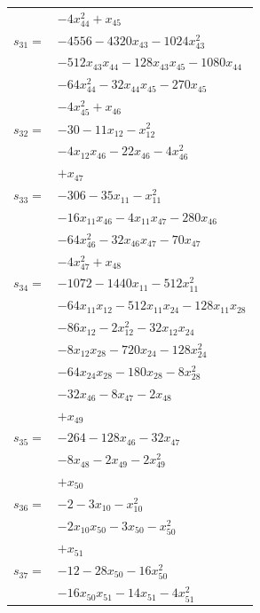 \begin{longtable}{@{}r@{\;}l@{}}
 & \(\displaystyle -4x_{44}^{2} +x_{45}\) \\[3pt]
\(s_{31}=\) & \(\displaystyle -4556 -4320x_{43} -1024x_{43}^{2}\) \\
 & \(\displaystyle -512x_{43}x_{44} -128x_{43}x_{45} -1080x_{44}\) \\
 & \(\displaystyle -64x_{44}^{2} -32x_{44}x_{45} -270x_{45}\) \\
 & \(\displaystyle -4x_{45}^{2} +x_{46}\) \\[3pt]
\(s_{32}=\) & \(\displaystyle -30 -11x_{12} -x_{12}^{2}\) \\
 & \(\displaystyle -4x_{12}x_{46} -22x_{46} -4x_{46}^{2}\) \\
 & \(\displaystyle +x_{47}\) \\[3pt]
\(s_{33}=\) & \(\displaystyle -306 -35x_{11} -x_{11}^{2}\) \\
 & \(\displaystyle -16x_{11}x_{46} -4x_{11}x_{47} -280x_{46}\) \\
 & \(\displaystyle -64x_{46}^{2} -32x_{46}x_{47} -70x_{47}\) \\
 & \(\displaystyle -4x_{47}^{2} +x_{48}\) \\[3pt]
\(s_{34}=\) & \(\displaystyle -1072 -1440x_{11} -512x_{11}^{2}\) \\
 & \(\displaystyle -64x_{11}x_{12} -512x_{11}x_{24} -128x_{11}x_{28}\) \\
 & \(\displaystyle -86x_{12} -2x_{12}^{2} -32x_{12}x_{24}\) \\
 & \(\displaystyle -8x_{12}x_{28} -720x_{24} -128x_{24}^{2}\) \\
 & \(\displaystyle -64x_{24}x_{28} -180x_{28} -8x_{28}^{2}\) \\
 & \(\displaystyle -32x_{46} -8x_{47} -2x_{48}\) \\
 & \(\displaystyle +x_{49}\) \\[3pt]
\(s_{35}=\) & \(\displaystyle -264 -128x_{46} -32x_{47}\) \\
 & \(\displaystyle -8x_{48} -2x_{49} -2x_{49}^{2}\) \\
 & \(\displaystyle +x_{50}\) \\[3pt]
\(s_{36}=\) & \(\displaystyle -2 -3x_{10} -x_{10}^{2}\) \\
 & \(\displaystyle -2x_{10}x_{50} -3x_{50} -x_{50}^{2}\) \\
 & \(\displaystyle +x_{51}\) \\[3pt]
\(s_{37}=\) & \(\displaystyle -12 -28x_{50} -16x_{50}^{2}\) \\
 & \(\displaystyle -16x_{50}x_{51} -14x_{51} -4x_{51}^{2}\) \\

\end{longtable}
